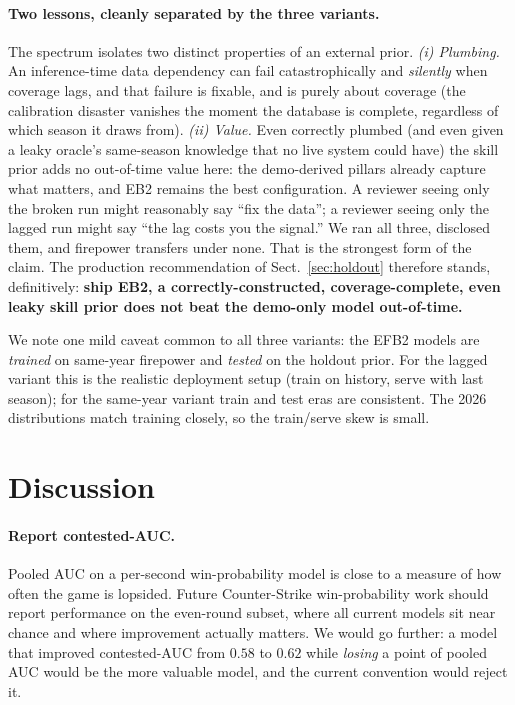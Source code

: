 \documentclass[11pt,a4paper]{article}
\begin{document}
\paragraph{Two lessons, cleanly separated by the three variants.}
The spectrum isolates two distinct properties of an external prior.
\emph{(i) Plumbing.} An inference-time data dependency can fail catastrophically and \emph{silently}
when coverage lags, and that failure is fixable, and is purely about coverage (the calibration
disaster vanishes the moment the database is complete, regardless of which season it draws from).
\emph{(ii) Value.} Even correctly plumbed (and even given a leaky oracle's same-season knowledge that
no live system could have) the skill prior adds no out-of-time value here: the demo-derived pillars
already capture what matters, and EB2 remains the best configuration. A reviewer seeing only the broken
run might reasonably say ``fix the data''; a reviewer seeing only the lagged run might say ``the lag
costs you the signal.'' We ran all three, disclosed them, and firepower transfers under none. That is
the strongest form of the claim. The production recommendation of Sect.~\ref{sec:holdout} therefore
stands, definitively: \textbf{ship EB2, a correctly-constructed, coverage-complete, even leaky
skill prior does not beat the demo-only model out-of-time.}

We note one mild caveat common to all three variants: the EFB2 models are \emph{trained} on same-year
firepower and \emph{tested} on the holdout prior. For the lagged variant this is the realistic
deployment setup (train on history, serve with last season); for the same-year variant train and test
eras are consistent. The 2026 distributions match training closely, so the train/serve skew is small.

\section{Discussion}
\label{sec:discussion}

\paragraph{Report contested-AUC.}
Pooled AUC on a per-second win-probability model is close to a measure of how often the game is
lopsided. Future Counter-Strike win-probability work should report performance on the even-round
subset, where all current models sit near chance and where improvement actually matters. We would
go further: a model that improved contested-AUC from $0.58$ to $0.62$ while \emph{losing} a point
of pooled AUC would be the more valuable model, and the current convention would reject it.
\end{document}
